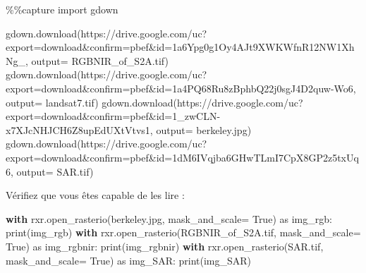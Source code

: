 \documentclass[
  11pt,
  letterpaper,
  open=any,
  twoside=false,
  french]{scrbook}
\newenvironment{Shaded}{\begin{snugshade}}{\end{snugshade}}
\newcommand{\BuiltInTok}[1]{\textcolor[rgb]{0.00,0.23,0.31}{#1}}
\newcommand{\ControlFlowTok}[1]{\textcolor[rgb]{0.00,0.23,0.31}{\textbf{#1}}}
\newcommand{\ImportTok}[1]{\textcolor[rgb]{0.00,0.46,0.62}{#1}}
\newcommand{\NormalTok}[1]{\textcolor[rgb]{0.00,0.23,0.31}{#1}}
\newcommand{\OperatorTok}[1]{\textcolor[rgb]{0.37,0.37,0.37}{#1}}
\newcommand{\StringTok}[1]{\textcolor[rgb]{0.13,0.47,0.30}{#1}}
\newcommand{\VariableTok}[1]{\textcolor[rgb]{0.07,0.07,0.07}{#1}}
\begin{document}
\begin{Shaded}
\begin{Highlighting}[]
\OperatorTok{\%\%}\NormalTok{capture}
\ImportTok{import}\NormalTok{ gdown}

\NormalTok{gdown.download(}\StringTok{\textquotesingle{}https://drive.google.com/uc?export=download\&confirm=pbef\&id=1a6Ypg0g1Oy4AJt9XWKWfnR12NW1XhNg\_\textquotesingle{}}\NormalTok{, output}\OperatorTok{=} \StringTok{\textquotesingle{}RGBNIR\_of\_S2A.tif\textquotesingle{}}\NormalTok{)}
\NormalTok{gdown.download(}\StringTok{\textquotesingle{}https://drive.google.com/uc?export=download\&confirm=pbef\&id=1a4PQ68Ru8zBphbQ22j0sgJ4D2quw{-}Wo6\textquotesingle{}}\NormalTok{, output}\OperatorTok{=} \StringTok{\textquotesingle{}landsat7.tif\textquotesingle{}}\NormalTok{)}
\NormalTok{gdown.download(}\StringTok{\textquotesingle{}https://drive.google.com/uc?export=download\&confirm=pbef\&id=1\_zwCLN{-}x7XJcNHJCH6Z8upEdUXtVtvs1\textquotesingle{}}\NormalTok{, output}\OperatorTok{=} \StringTok{\textquotesingle{}berkeley.jpg\textquotesingle{}}\NormalTok{)}
\NormalTok{gdown.download(}\StringTok{\textquotesingle{}https://drive.google.com/uc?export=download\&confirm=pbef\&id=1dM6IVqjba6GHwTLmI7CpX8GP2z5txUq6\textquotesingle{}}\NormalTok{, output}\OperatorTok{=} \StringTok{\textquotesingle{}SAR.tif\textquotesingle{}}\NormalTok{)}
\end{Highlighting}
\end{Shaded}

Vérifiez que vous êtes capable de les lire :

\begin{Shaded}
\begin{Highlighting}[]
\ControlFlowTok{with}\NormalTok{ rxr.open\_rasterio(}\StringTok{\textquotesingle{}berkeley.jpg\textquotesingle{}}\NormalTok{, mask\_and\_scale}\OperatorTok{=} \VariableTok{True}\NormalTok{) }\ImportTok{as}\NormalTok{ img\_rgb:}
    \BuiltInTok{print}\NormalTok{(img\_rgb)}
\ControlFlowTok{with}\NormalTok{ rxr.open\_rasterio(}\StringTok{\textquotesingle{}RGBNIR\_of\_S2A.tif\textquotesingle{}}\NormalTok{, mask\_and\_scale}\OperatorTok{=} \VariableTok{True}\NormalTok{) }\ImportTok{as}\NormalTok{ img\_rgbnir:}
    \BuiltInTok{print}\NormalTok{(img\_rgbnir)}
\ControlFlowTok{with}\NormalTok{ rxr.open\_rasterio(}\StringTok{\textquotesingle{}SAR.tif\textquotesingle{}}\NormalTok{, mask\_and\_scale}\OperatorTok{=} \VariableTok{True}\NormalTok{) }\ImportTok{as}\NormalTok{ img\_SAR:}
    \BuiltInTok{print}\NormalTok{(img\_SAR)}
\end{Highlighting}
\end{Shaded}
\end{document}
